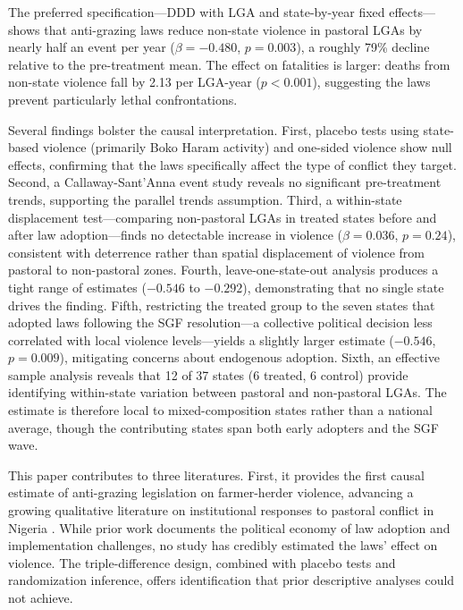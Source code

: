 \documentclass[12pt]{article}
\begin{document}
The preferred specification---DDD with LGA and state-by-year fixed effects---shows that anti-grazing laws reduce non-state violence in pastoral LGAs by nearly half an event per year ($\beta = -0.480$, $p = 0.003$), a roughly 79\% decline relative to the pre-treatment mean. The effect on fatalities is larger: deaths from non-state violence fall by 2.13 per LGA-year ($p < 0.001$), suggesting the laws prevent particularly lethal confrontations.

Several findings bolster the causal interpretation. First, placebo tests using state-based violence (primarily Boko Haram activity) and one-sided violence show null effects, confirming that the laws specifically affect the type of conflict they target. Second, a Callaway-Sant'Anna event study reveals no significant pre-treatment trends, supporting the parallel trends assumption. Third, a within-state displacement test---comparing non-pastoral LGAs in treated states before and after law adoption---finds no detectable increase in violence ($\beta = 0.036$, $p = 0.24$), consistent with deterrence rather than spatial displacement of violence from pastoral to non-pastoral zones. Fourth, leave-one-state-out analysis produces a tight range of estimates ($-0.546$ to $-0.292$), demonstrating that no single state drives the finding. Fifth, restricting the treated group to the seven states that adopted laws following the SGF resolution---a collective political decision less correlated with local violence levels---yields a slightly larger estimate ($-0.546$, $p = 0.009$), mitigating concerns about endogenous adoption. Sixth, an effective sample analysis reveals that 12 of 37 states (6 treated, 6 control) provide identifying within-state variation between pastoral and non-pastoral LGAs. The estimate is therefore local to mixed-composition states rather than a national average, though the contributing states span both early adopters and the SGF wave.

This paper contributes to three literatures. First, it provides the first causal estimate of anti-grazing legislation on farmer-herder violence, advancing a growing qualitative literature on institutional responses to pastoral conflict in Nigeria \citep{ajala2020anti, ochonu2022anti, akinyetun2021institutional}. While prior work documents the political economy of law adoption and implementation challenges, no study has credibly estimated the laws' effect on violence. The triple-difference design, combined with placebo tests and randomization inference, offers identification that prior descriptive analyses could not achieve.
\end{document}

